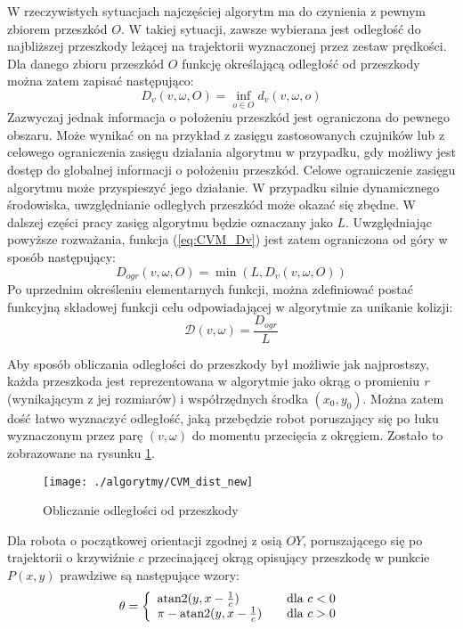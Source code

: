 	W rzeczywistych sytuacjach najczęściej algorytm ma do czynienia z pewnym zbiorem przeszkód $O$. W takiej sytuacji, zawsze wybierana jest odległość do najbliższej przeszkody leżącej na trajektorii wyznaczonej
	przez zestaw prędkości. Dla danego zbioru przeszkód $O$ funkcję określającą odległość od przeszkody można zatem zapisać następująco:
 	\begin{equation}\label{eq:CVM_Dv}
	D_v(v,\omega,O)= \underset{o \in O}{\operatorname{inf}} d_v(v,\omega,o)
	\end{equation}
	Zazwyczaj jednak informacja o położeniu przeszkód jest ograniczona do pewnego obszaru. Może wynikać on na przykład z zasięgu zastosowanych czujników lub z celowego ograniczenia
	zasięgu działania algorytmu w przypadku, gdy możliwy jest dostęp do globalnej informacji o położeniu przeszkód. Celowe ograniczenie zasięgu algorytmu może przyspieszyć jego działanie.
	W przypadku silnie dynamicznego środowiska, uwzględnianie odległych przeszkód może okazać się zbędne. W dalszej części pracy zasięg algorytmu  będzie oznaczany jako $L$.
	Uwzględniając powyższe rozważania, funkcja  (\ref{eq:CVM_Dv}) jest zatem ograniczona od góry w sposób następujący:
 	\begin{equation}\label{eq:CVM_Dv_ogr}
	D_{ogr}(v,\omega,O)= \min(L, D_v(v,\omega,O))
	\end{equation}
	Po uprzednim określeniu elementarnych funkcji,  można zdefiniować postać funkcyjną składowej funkcji celu odpowiadającej w algorytmie za unikanie kolizji:
	\begin{equation} \label{eq:CVM_dist}
	\mathcal{D}(v,\omega)=\frac{D_{ogr}}{L}
	\end{equation}
 	
	Aby sposób obliczania odległości do przeszkody był możliwie jak najprostszy, każda przeszkoda jest
	reprezentowana w algorytmie jako okrąg o  promieniu \emph{r} (wynikającym z jej rozmiarów) i współrzędnych środka $(x_0,y_0)$. Można zatem dość łatwo wyznaczyć odległość, jaką przebędzie robot poruszający się po łuku wyznaczonym przez parę $(v,\omega)$ do
	momentu przecięcia z okręgiem. Zostało to zobrazowane na rysunku \ref{fig:CVM_dist}.
	\begin{figure}[!h]
	\centering
	\texttt{[image: ./algorytmy/CVM\_dist\_new]}
	\caption{ Obliczanie odległości od przeszkody \label{fig:CVM_dist}}
	\end{figure}
	
	Dla robota o początkowej orientacji zgodnej z osią $OY$, poruszającego się po trajektorii o krzywiźnie $c$ przecinającej
	okrąg opisujący przeszkodę w punkcie $P(x,y)$ prawdziwe są następujące wzory:
	\begin{equation}\label{eq:CVM_teta}
	\theta= \left\{ 
	\begin{array}{l l}
	\text{atan2}(y,x-\frac{1}{c} )& \quad \mbox{dla $c<0$}\\
  	\pi-\text{atan2}(y,x-\frac{1}{c}) & \quad \mbox{dla $c>0$}\\
	\end{array} \right. 
	\end{equation}
	
